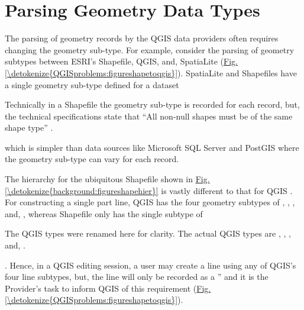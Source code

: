 \documentclass[a4paper,11pt,english]{sphinxmanual}
\begin{document}
\section{Parsing Geometry Data Types}
\label{\detokenize{QGISproblems:parsing-geometry-data-types}}
The parsing of geometry records by the QGIS data providers often requires changing the geometry sub-type.  For example, consider the parsing of geometry subtypes between ESRI’s Shapefile, QGIS, and, SpatiaLite (\hyperref[\detokenize{QGISproblems:figureshapetoqgis}]{Fig.\@ \ref{\detokenize{QGISproblems:figureshapetoqgis}}}).  SpatiaLite and Shapefiles have a single geometry sub-type defined for a dataset %
\begin{footnote}[13]\sphinxAtStartFootnote
Technically in a Shapefile the geometry sub-type is recorded for each record, but, the technical specifications state that “All non-null shapes must be of the same shape type” .
%
\end{footnote} which is simpler than data sources like Microsoft SQL Server and PostGIS where the geometry sub-type can vary for each record.

The hierarchy for the ubiquitous Shapefile shown in \hyperref[\detokenize{background:figureshapehier}]{Fig.\@ \ref{\detokenize{background:figureshapehier}}} is vastly different to that for QGIS .  For constructing a single part line, QGIS has the four geometry subtypes of , , , and, , whereas Shapefile only has the single subtype of  %
\begin{footnote}[8]\sphinxAtStartFootnote
The QGIS types were renamed here for clarity.  The actual QGIS types are , , , and, .
%
\end{footnote}.  Hence, in a QGIS editing session, a user may create a line using any of QGIS’s four line subtypes, but, the line will only be recorded as a ” and it is the Provider’s task to inform QGIS of this requirement (\hyperref[\detokenize{QGISproblems:figureshapetoqgis}]{Fig.\@ \ref{\detokenize{QGISproblems:figureshapetoqgis}}}).
\end{document}
